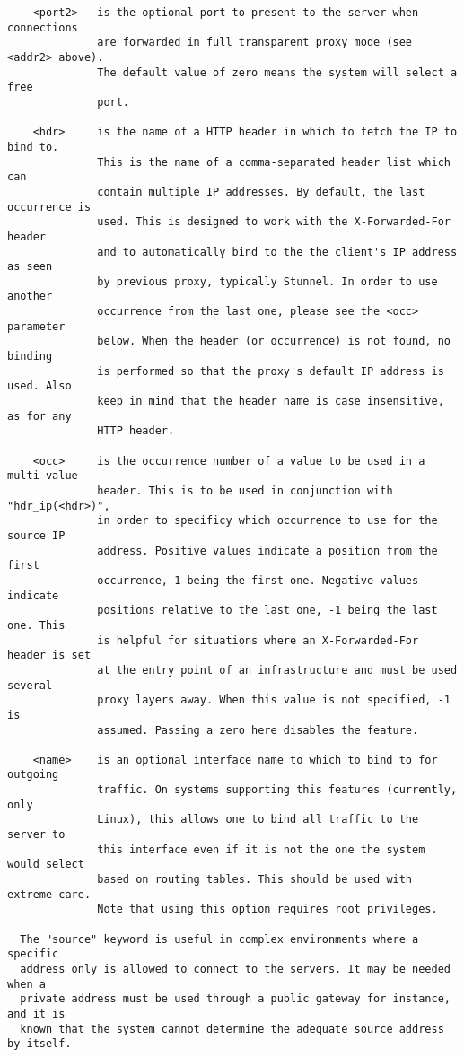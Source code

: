 \begin{verbatim}
    <port2>   is the optional port to present to the server when connections
              are forwarded in full transparent proxy mode (see <addr2> above).
              The default value of zero means the system will select a free
              port.

    <hdr>     is the name of a HTTP header in which to fetch the IP to bind to.
              This is the name of a comma-separated header list which can
              contain multiple IP addresses. By default, the last occurrence is
              used. This is designed to work with the X-Forwarded-For header
              and to automatically bind to the the client's IP address as seen
              by previous proxy, typically Stunnel. In order to use another
              occurrence from the last one, please see the <occ> parameter
              below. When the header (or occurrence) is not found, no binding
              is performed so that the proxy's default IP address is used. Also
              keep in mind that the header name is case insensitive, as for any
              HTTP header.

    <occ>     is the occurrence number of a value to be used in a multi-value
              header. This is to be used in conjunction with "hdr_ip(<hdr>)",
              in order to specificy which occurrence to use for the source IP
              address. Positive values indicate a position from the first
              occurrence, 1 being the first one. Negative values indicate
              positions relative to the last one, -1 being the last one. This
              is helpful for situations where an X-Forwarded-For header is set
              at the entry point of an infrastructure and must be used several
              proxy layers away. When this value is not specified, -1 is
              assumed. Passing a zero here disables the feature.

    <name>    is an optional interface name to which to bind to for outgoing
              traffic. On systems supporting this features (currently, only
              Linux), this allows one to bind all traffic to the server to
              this interface even if it is not the one the system would select
              based on routing tables. This should be used with extreme care.
              Note that using this option requires root privileges.

  The "source" keyword is useful in complex environments where a specific
  address only is allowed to connect to the servers. It may be needed when a
  private address must be used through a public gateway for instance, and it is
  known that the system cannot determine the adequate source address by itself.


\end{verbatim}
